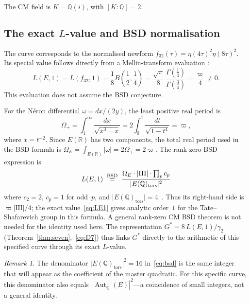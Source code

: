 \documentclass[12pt,reqno]{amsart}
\theoremstyle{definition}
\theoremstyle{remark}
\newtheorem{remark}[theorem]{Remark}
\newcommand{\QQ}{\mathbb{Q}}
\newcommand{\Qbar}{\overline{\QQ}}
\newcommand{\Gstar}{G^{\!*}}
\newcommand{\varpiup}{\varpi}
\newcommand{\Aut}{\operatorname{Aut}}
\newcommand{\abs}[1]{\lvert #1 \rvert}
\begin{document}
The CM field is $K = \QQ(i)$, with $[K:\QQ] = 2$.

\subsection{The exact \texorpdfstring{$L$}{L}-value and BSD normalisation}\label{ssec:bsd}

The curve corresponds to the normalised newform
$f_{32}(\tau)=\eta(4\tau)^2\eta(8\tau)^2$.
Its special value follows directly from a Mellin-transform evaluation
\cite[Lemma~3.1]{LiLongTu}:
\begin{equation}\label{eq:LE1}
  L(E,1)=L(f_{32},1)
  =\frac18 B\!\left(\frac12,\frac14\right)
  =\frac{\sqrt{\pi}}8\,
    \frac{\Gamma(\frac14)}{\Gamma(\frac34)}
  =\frac{\varpiup}{4}\ne0.
\end{equation}
This evaluation does not assume the BSD conjecture.

For the N\'{e}ron differential $\omega=dx/(2y)$, the least positive
real period is
\[
  \Omega_{+}=\int_1^\infty\frac{dx}{\sqrt{x^3-x}}
  =2\int_0^1\frac{dt}{\sqrt{1-t^4}}=\varpiup,
\]
where $x=t^{-2}$.  Since $E(\mathbb R)$ has two components, the total
real period used in the BSD formula is
$\Omega_E=\int_{E(\mathbb R)}|\omega|=2\Omega_{+}=2\varpiup$.
The rank-zero BSD expression is
\begin{equation}\label{eq:bsd}
  L(E,1) \;\stackrel{\mathrm{BSD}}{=}\;
  \frac{\Omega_E\cdot\abs{\text{III}}\cdot
  \prod_{p}c_{p}}{%
  \abs{E(\QQ)_{\mathrm{tors}}}^{2}}
\end{equation}
where $c_2=2$, $c_p=1$ for odd~$p$, and
$\abs{E(\QQ)_{\mathrm{tors}}}=4$~\cite{Cremona}.
Thus its right-hand side is $\varpiup\abs{\text{III}}/4$;
the exact value~\eqref{eq:LE1} gives analytic order~$1$ for the
Tate--Shafarevich group in this formula.  A general rank-zero CM
BSD theorem is not needed for the identity used here.
The representation $\Gstar = 8\,L(E,1)/\gamma_{2}$
(Theorem~\ref{thm:seven},~\eqref{eq:D7}) thus links $\Gstar$ directly to
the arithmetic of this specified curve through its exact $L$-value.

\begin{remark}\label{rem:16inBSD}
The denominator $\abs{E(\QQ)_{\mathrm{tors}}}^{2}=16$ in~\eqref{eq:bsd}
is the same integer that will appear as the coefficient of the master quadratic.
For this specific curve, this denominator also equals
${|\Aut_{\Qbar}(E)|}^{2}$---a coincidence of small integers, not a general
identity.
\end{remark}
\end{document}
